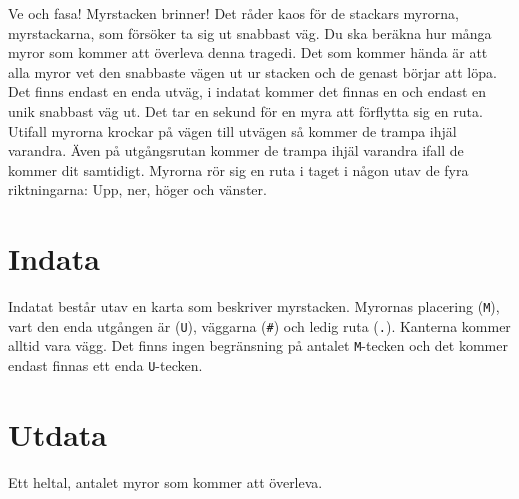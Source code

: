 
Ve och fasa! Myrstacken brinner! Det råder kaos för de stackars
myrorna, myrstackarna, som försöker ta sig ut snabbast väg. Du ska
beräkna hur många myror som kommer att överleva denna tragedi.
Det som kommer hända är att alla myror vet den snabbaste vägen ut
ur stacken och de genast börjar att löpa. Det finns endast en enda
utväg, i indatat kommer det finnas en och endast en unik snabbast väg
ut. Det tar en sekund för en myra att förflytta sig en ruta. Utifall
myrorna krockar på vägen till utvägen så kommer de trampa ihjäl
varandra. Även på utgångsrutan kommer de trampa ihjäl varandra ifall
de kommer dit samtidigt. Myrorna rör sig en ruta i taget i någon
utav de fyra riktningarna: Upp, ner, höger och vänster.

\section*{Indata}

Indatat består utav en karta som beskriver myrstacken. Myrornas
placering (\texttt{M}), vart den enda utgången är (\texttt{U}),
väggarna (\texttt{\#}) och ledig ruta (\texttt{.}). Kanterna
kommer alltid vara vägg. Det finns ingen begränsning på
antalet \texttt{M}-tecken och det kommer endast finnas ett enda
\texttt{U}-tecken.

\section*{Utdata}

Ett heltal, antalet myror som kommer att överleva.
